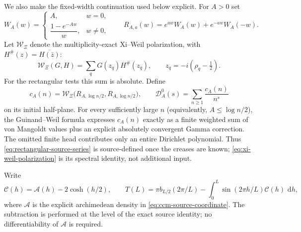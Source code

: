 \documentclass[11pt]{article}
\theoremstyle{definition}
\theoremstyle{remark}
\newcommand{\dd}{\,\mathrm d}
\begin{document}
We also make the fixed-width continuation used below explicit.  For $A>0$ set
\[
 W_A(w)=
 \begin{cases}
  A,&w=0,\\[1mm]
  \dfrac{1-e^{-Aw}}{w},&w\ne0,
 \end{cases}
 \qquad
 R_{A,a}(w)=e^{aw}W_A(w)+e^{-aw}W_A(-w).
 \tag{3.3}\label{eq:rectangular-test}
\]
Let $\mathcal W_\Xi$ denote the multiplicity-exact Xi--Weil polarization, with
$H^\#(z)=\overline{H(\bar z)}$:
\[
 \mathcal W_\Xi(G,H)
 =\sum_q G(z_q)H^\#(z_q),
 \qquad z_q=-i(\rho_q-\tfrac12).
 \tag{3.4}\label{eq:xi-weil-polarization}
\]
For the rectangular tests this sum is absolute.  Define
\[
 c_A(n)=\mathcal W_\Xi
   \bigl(R_{A,\log n/2},R_{A,\log n/2}\bigr),
 \qquad
 \mathscr D_A^{0}(s)=\sum_{n\ge1}\frac{c_A(n)}{n^s}
 \tag{3.5}\label{eq:rectangular-source-series}
\]
on its initial half-plane.  For every sufficiently large $n$ (equivalently,
$A\leq\log n/2$), the Guinand--Weil formula expresses $c_A(n)$ exactly as a finite weighted sum
of von Mangoldt values plus an explicit absolutely convergent Gamma correction.  The omitted
finite head contributes only an entire Dirichlet polynomial.  Thus
\eqref{eq:rectangular-source-series} is source-defined once the creases are known;
\eqref{eq:xi-weil-polarization} is its spectral identity, not additional input.

Write
\[
 \mathcal C(h)=\mathcal A(h)-2\cosh(h/2),\qquad
 T(L)=\pi b_{L/2}(2\pi/L)-
   \int_0^L\sin(2\pi h/L)\mathcal C(h)\,\dd h,
 \tag{3.6}\label{eq:arithmetic-first-clock}
\]
where $\mathcal A$ is the explicit archimedean density in
\eqref{eq:ccm-source-coordinate}.  The subtraction is performed at the level of the exact
source identity; no differentiability of $\mathcal A$ is required.
\end{document}
